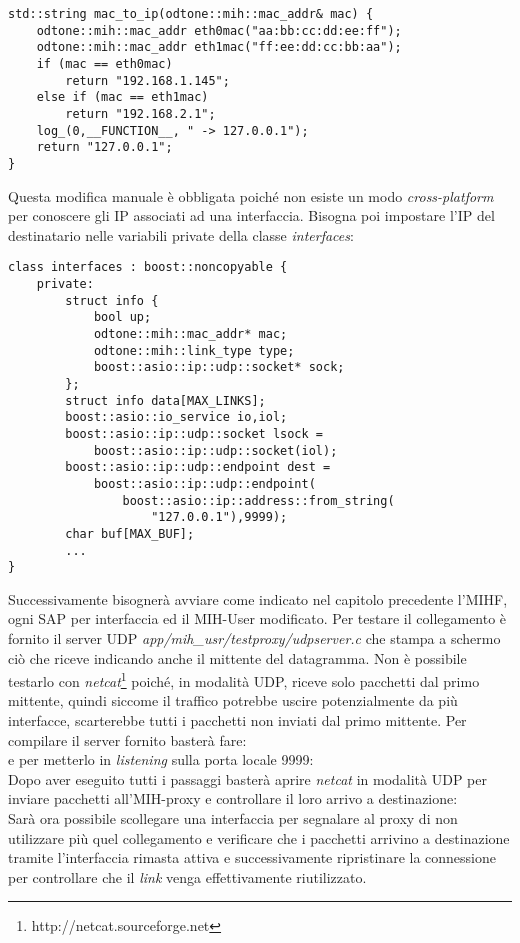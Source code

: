 \begin{verbatim}
std::string mac_to_ip(odtone::mih::mac_addr& mac) {
    odtone::mih::mac_addr eth0mac("aa:bb:cc:dd:ee:ff");
    odtone::mih::mac_addr eth1mac("ff:ee:dd:cc:bb:aa");
    if (mac == eth0mac)
        return "192.168.1.145";
    else if (mac == eth1mac)
        return "192.168.2.1";
    log_(0,__FUNCTION__, " -> 127.0.0.1");
    return "127.0.0.1";
}

\end{verbatim}

Questa modifica manuale è obbligata poiché non esiste un modo {\em cross-platform} per conoscere gli IP associati ad una interfaccia. Bisogna poi impostare l'IP del destinatario nelle variabili private della classe {\em interfaces}:

\begin{verbatim}
class interfaces : boost::noncopyable {
    private:
        struct info {
            bool up;
            odtone::mih::mac_addr* mac;
            odtone::mih::link_type type;
            boost::asio::ip::udp::socket* sock;
        };
        struct info data[MAX_LINKS];
        boost::asio::io_service io,iol;
        boost::asio::ip::udp::socket lsock = 
            boost::asio::ip::udp::socket(iol);
        boost::asio::ip::udp::endpoint dest = 
            boost::asio::ip::udp::endpoint(
                boost::asio::ip::address::from_string(
                    "127.0.0.1"),9999);
        char buf[MAX_BUF];
        ...
}
\end{verbatim}

Successivamente bisognerà avviare come indicato nel capitolo precedente l'MIHF, ogni SAP per interfaccia ed il MIH-User modificato. Per testare il collegamento è fornito il server UDP {\em app/mih\_usr/testproxy/udpserver.c} che stampa a schermo ciò che riceve indicando anche il mittente del datagramma. Non è possibile testarlo con {\em netcat}\footnote{http://netcat.sourceforge.net} poiché, in modalità UDP, riceve solo pacchetti dal primo mittente, quindi siccome il traffico potrebbe uscire potenzialmente da più interfacce, scarterebbe tutti i pacchetti non inviati dal primo mittente. Per compilare il server fornito basterà fare:\\
e per metterlo in {\em listening} sulla porta locale 9999:\\
Dopo aver eseguito tutti i passaggi basterà aprire {\em netcat} in modalità UDP per inviare pacchetti all'MIH-proxy e controllare il loro arrivo a destinazione:\\
Sarà ora possibile scollegare una interfaccia per segnalare al proxy di non utilizzare più quel collegamento e verificare che i pacchetti arrivino a destinazione tramite l'interfaccia rimasta attiva e successivamente ripristinare la connessione per controllare che il {\em link} venga effettivamente riutilizzato.

